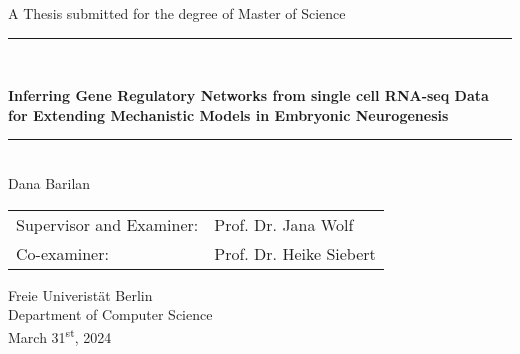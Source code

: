 
\begin{titlepage}
\begin{center}

\newcommand{\HorizontalLine}{\rule{\linewidth}{0.3mm}}

{\Large A Thesis submitted for the degree of Master of Science}\\[1.3cm]


\HorizontalLine \\[0.4cm]
\begin{spacing}{3}
    {\huge \bfseries Inferring Gene Regulatory Networks from single cell RNA-seq Data } \\
    {\huge \bfseries for Extending Mechanistic Models in Embryonic Neurogenesis} \\
\end{spacing}
\HorizontalLine \\[1.5cm]


{\Large Dana Barilan} \\[2cm]


\begin{tabular}[hc]{>{\large}l >{\large}l}
  Supervisor and Examiner: & Prof. Dr. Jana Wolf \\[0.3cm]
  Co-examiner: & Prof. Dr. Heike Siebert \\[1.2cm]
\end{tabular}
\vfill  %

\Large {
    Freie Univeristät Berlin\\
    Department of Computer Science\\

    March 31\textsuperscript{st}, 2024\\
}
\end{center}
\end{titlepage}

